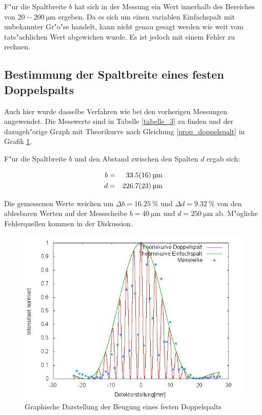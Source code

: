		F"ur die Spaltbreite $b$ hat sich in der Messung ein Wert innerhalb des Bereiches von $20-200 \SI{}{\micro \meter}$ ergeben. Da es sich um einen variablen Einfachspalt mit unbekannter Gr"o"se handelt, kann nicht genau gesagt werden wie weit vom tats"achlichen Wert abgewichen wurde. Es ist jedoch mit einem Fehler zu rechnen.

\clearpage
		\newpage
		\newpage
	\subsection{Bestimmung der Spaltbreite eines festen Doppelspalts} 
	\label{sub:bestimmung_der_spaltbreite_eines_festen_doppelspalts}
	
		Auch hier wurde dasselbe Verfahren wie bei den vorherigen Messungen angewendet.
		Die Messwerte sind in Tabelle \ref{tabelle_3} zu finden und der dazugeh"orige Graph mit Theorikurve nach Gleichung \eqref{prop_doppelspalt} in Grafik \ref{graph3}.

		F"ur die Spaltbreite $b$ und den Abstand zwischen den Spalten $d$ ergab sich:

		\begin{eqnarray*}
			b &=& \SI{33.5 (16)}{\micro \meter}\\
			d &=& \SI{226.7 (23)}{\micro \meter}
		\end{eqnarray*}

		Die gemessenen Werte weichen um $\Delta b = \SI{16.25}{\percent}$ und $\Delta d = \SI{9.32}{\percent}$ von den ablesbaren Werten auf der Messscheibe $b = \SI{40}{\micro \meter}$ und $d = \SI{250}{\micro \meter}$ ab.
		M"ogliche Fehlerquellen kommen in der Diskussion.

		

		\begin{figure}[H]
			\centering
			\includegraphics[width = 14cm]{graph3.jpg}
			\caption{Graphische Darstellung der Beugung eines festen Doppelspalts}
			\label{graph3}
		\end{figure}
		\clearpage
